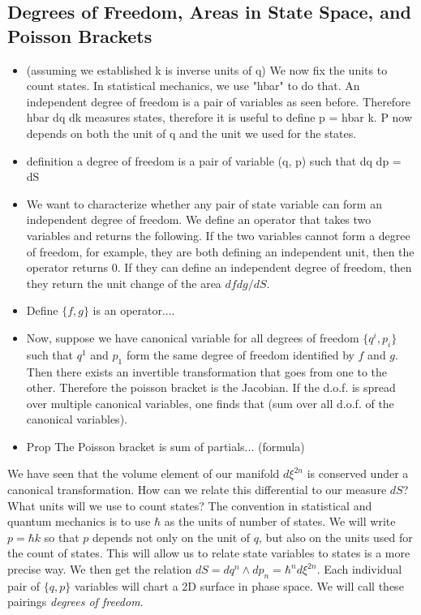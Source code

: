 \documentclass{article}
\begin{document}
\subsection{Degrees of Freedom, Areas in State Space, and Poisson Brackets}
\begin{itemize}
	
	\item (assuming we established k is inverse units of q) We now fix the units to count states. In statistical mechanics, we use "hbar" to do that. An independent degree of freedom is a pair of variables as seen before. Therefore hbar dq dk measures states, therefore it is useful to define p = hbar k. P now depends on both the unit of q and the unit we used for the states.
	
	\item definition a degree of freedom is a pair of variable (q, p) such that dq dp = dS
	
	\item We want to characterize whether any pair of state variable can form an independent degree of freedom. We define an operator that takes two variables and returns the following. If the two variables cannot form a degree of freedom, for example, they are both defining an independent unit, then the operator returns 0. If they can define an independent degree of freedom, then they return the unit change of the area $df dg/dS$.
	
	\item Define $\{ f , g\}$ is an operator....
	
	\item Now, suppose we have canonical variable for all degrees of freedom $\{q^i, p_i\}$ such that $q^1$ and $p_1$ form the same degree of freedom identified by $f$ and $g$. Then there exists an invertible transformation that goes from one to the other. Therefore the poisson bracket is the Jacobian. If the d.o.f. is spread over multiple canonical variables, one finds that (sum over all d.o.f. of the canonical variables).
	
	\item Prop The Poisson bracket is sum of partials... (formula)
\end{itemize}

	We have seen that the volume element of our manifold $d \xi^{2n}$ is conserved under a canonical transformation. How can we relate this differential to our measure $dS$? What units will we use to count states? The convention in statistical and quantum mechanics is to use $\hbar$ as the units of number of states. We will write $p = \hbar k$ so that $p$ depends not only on the unit of $q$, but also on the units used for the count of states. This will allow us to relate state variables to states is a more precise way. We then get the relation $dS = dq^n \land dp_n = \hbar^n d\xi^{2n}$. Each individual pair of $\{q,p\}$  variables will chart a 2D surface in phase space. We will call these pairings \textit{degrees of freedom}.
\end{document}
